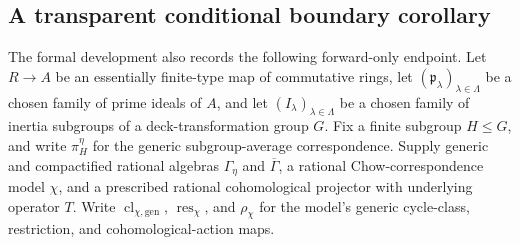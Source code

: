 \documentclass[11pt]{article}
\theoremstyle{definition}
\theoremstyle{remark}
\newcommand{\Geta}{\Gamma_{\eta}}
\newcommand{\Gbar}{\overline{\Gamma}}
\begin{document}
\subsection{A transparent conditional boundary corollary}
\label{subsec:conditional-boundary}

The formal development also records the following forward-only endpoint.
Let \(R\to A\) be an essentially finite-type map of commutative rings, let
\((\mathfrak p_\lambda)_{\lambda\in\Lambda}\) be a chosen family of prime ideals of
\(A\), and let \((I_\lambda)_{\lambda\in\Lambda}\) be a chosen family of
inertia subgroups of a deck-transformation group \(G\).  Fix a finite subgroup
\(H\leq G\), and write \(\pi_H^\eta\) for the generic subgroup-average
correspondence.  Supply generic and compactified rational algebras
\(\Geta\) and
\(\Gbar\), a rational Chow-correspondence model \(\chi\),
and a prescribed rational cohomological projector with underlying operator
\(T\).  Write \(\operatorname{cl}_{\chi,\mathrm{gen}}\),
\(\operatorname{res}_{\chi}\), and \(\rho_{\chi}\) for the model's generic
cycle-class, restriction, and cohomological-action maps.
\end{document}
